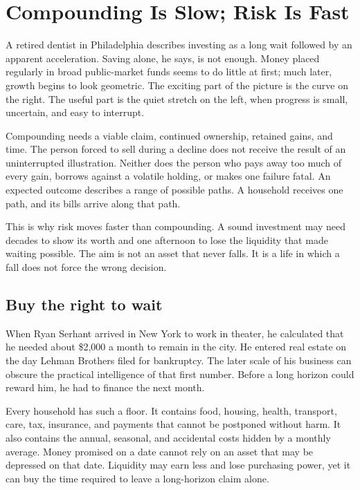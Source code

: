 \chapter{Compounding Is Slow; Risk Is Fast}

A retired dentist in Philadelphia describes investing as a long wait followed
by an apparent acceleration. Saving alone, he says, is not enough. Money placed
regularly in broad public-market funds seems to do little at first; much later,
growth begins to look geometric. The exciting part of the picture is the curve
on the right. The useful part is the quiet stretch on the left, when progress is
small, uncertain, and easy to interrupt.

Compounding needs a viable claim, continued ownership, retained gains, and
time. The person forced to sell during a decline does not receive the result of
an uninterrupted illustration. Neither does the person who pays away too much
of every gain, borrows against a volatile holding, or makes one failure fatal.
An expected outcome describes a range of possible paths. A household receives
one path, and its bills arrive along that path.

This is why risk moves faster than compounding. A sound investment may need
decades to show its worth and one afternoon to lose the liquidity that made
waiting possible. The aim is not an asset that never falls. It is a life in
which a fall does not force the wrong decision.

\section{Buy the right to wait}

When Ryan Serhant arrived in New York to work in theater, he calculated that he
needed about \$2,000 a month to remain in the city. He entered real estate on
the day Lehman Brothers filed for bankruptcy. The later scale of his business
can obscure the practical intelligence of that first number. Before a long
horizon could reward him, he had to finance the next month.

Every household has such a floor. It contains food, housing, health, transport,
care, tax, insurance, and payments that cannot be postponed without harm. It
also contains the annual, seasonal, and accidental costs hidden by a monthly
average. Money promised on a date cannot rely on an asset that may be depressed
on that date. Liquidity may earn less and lose purchasing power, yet it can buy
the time required to leave a long-horizon claim alone.

